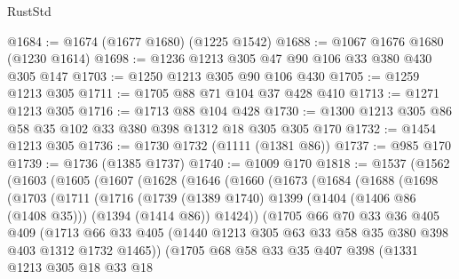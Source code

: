 \begin{lexlean}{RustStd}
\begin{coremodule}
{\begin{coremodule}
{{{{{{{{{{{{{{@1684 := @1674 (@1677 @1680) (@1225 @1542)
@1688 := @1067 @1676 @1680 (@1230 @1614)
@1698 := @1236 @1213 @305 @47 @90 @106 @33 @380 @430 @305 @147
@1703 := @1250 @1213 @305 @90 @106 @430
@1705 := @1259 @1213 @305
@1711 := @1705 @88 @71 @104 @37 @428 @410
@1713 := @1271 @1213 @305
@1716 := @1713 @88 @104 @428
@1730 := @1300 @1213 @305 @86 @58 @35 @102 @33 @380 @398 @1312 @18 @305 @305 @170
@1732 := @1454 @1213 @305
@1736 := @1730 @1732 (@1111 (@1381 @86))
@1737 := @985 @170
@1739 := @1736 (@1385 @1737)
@1740 := @1009 @170
@1818 := @1537
    (@1562
      (@1603
        (@1605
          (@1607
            (@1628
              (@1646
                (@1660
                  (@1673
                    (@1684
                      (@1688
                        (@1698
                          (@1703
                            (@1711
                              (@1716
                                (@1739
                                  (@1389 @1740)
                                  @1399
                                  (@1404 (@1406 @86 (@1408 @35)))
                                  (@1394 (@1414 @86))
                                  @1424))
                              (@1705
                                @66
                                @70
                                @33
                                @36
                                @405
                                @409
                                (@1713
                                  @66
                                  @33
                                  @405
                                  (@1440
                                    @1213
                                    @305
                                    @63
                                    @33
                                    @58
                                    @35
                                    @380
                                    @398
                                    @403
                                    @1312
                                    @1732
                                    @1465))
                                (@1705
                                  @68
                                  @58
                                  @33
                                  @35
                                  @407
                                  @398
                                  (@1331
                                    @1213
                                    @305
                                    @18
                                    @33
                                    @18
}}}}}}}}}}}}}}
\end{coremodule}}
\end{coremodule}
\end{lexlean}
